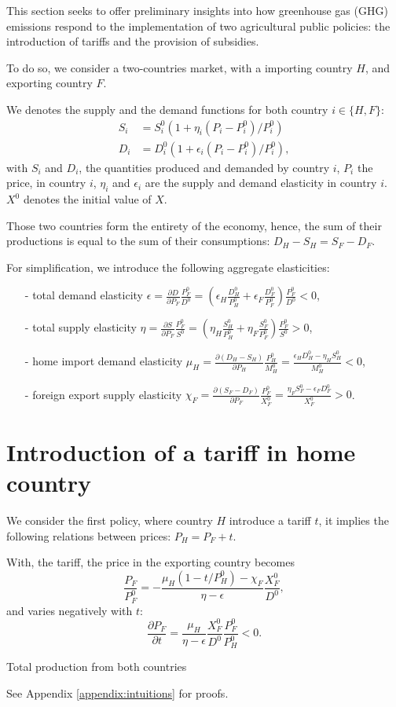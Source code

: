 
This section seeks to offer preliminary insights into how greenhouse gas (GHG) emissions respond to the implementation of two agricultural public policies: the introduction of tariffs and the provision of subsidies.

To do so, we consider a two-countries market, with a importing country $H$, and exporting country $F$.

We denotes the supply and the demand functions for both country $i \in \{H, F\}$: 
\begin{align*}
S_i &= S_i^0 \left( 1+\eta_i \left( P_i-P^0_i \right)/P_i^0 \right) \\ 
D_i &= D_i^0 \left( 1+\epsilon_i \left( P_i-P_i^0 \right)/P_i^0 \right),
\end{align*}
with $S_i$ and $D_i$, the quantities produced and demanded by country $i$, $P_i$ the price, in country $i$, $\eta_i$ and $\epsilon_i$ are the supply and demand elasticity in country $i$. $X^0$ denotes the initial value of $X$.

Those two countries form the entirety of the economy, hence, the sum of their productions is equal to the sum of their consumptions: $D_H-S_H = S_F-D_F$.

For simplification, we introduce the following aggregate elasticities:
\begin{itemize}
    \item[-] total demand elasticity $\epsilon=\frac{\partial D}{\partial P_F} \frac{P_F^0}{D^0}= \left( \epsilon_H \frac{D_H^0}{P_H^0}+\epsilon_F \frac{D_F^0}{P_F^0} \right)\frac{P_F^0}{D^0} < 0$,
    \item[-] total supply elasticity $\eta=\frac{\partial S}{\partial P_F}\frac{P_F^0}{S^0}=\left( \eta_H \frac{S_H^0}{P_H^0}+\eta_F \frac{S_F^0}{P_F^0} \right)\frac{P_F^0}{S^0} > 0$,
    \item[-] home import demand elasticity $\mu_H= \frac{\partial (D_H-S_H)}{\partial P_H}\frac{P_H^0}{M_H^0}=\frac{\epsilon_H D_H^0-\eta_H S_H^0}{M_H^0}<0$,
    \item[-] foreign export supply elasticity $\chi_F=\frac{\partial (S_F-D_F)}{\partial P_F}\frac{P_F^0}{X_F^0}=\frac{\eta_F S_F^0-\epsilon_F D_F^0}{X_F^0}>0$.
\end{itemize}



\section{Introduction of a tariff in home country}\label{Sec_tariff}

We consider the first policy, where country $H$ introduce a tariff $t$, it implies the following relations between prices: $P_H = P_F + t$.

With, the tariff, the price in the exporting country becomes
$$
\frac{P_F}{P_F^0}= -\frac{\mu_H (1 - t/P_H^0) - \chi_F}{\eta-\epsilon}\frac{X_F^0}{D^0},
$$
and varies negatively with $t$: 
$$
\frac{\partial P_F}{\partial t} = \frac{\mu_H}{\eta - \epsilon}  \frac{X_F^0}{D^0} \frac{P_F^0}{P_H^0}<0.
$$

Total production from both countries 

See Appendix \ref{appendix:intuitions} for proofs.